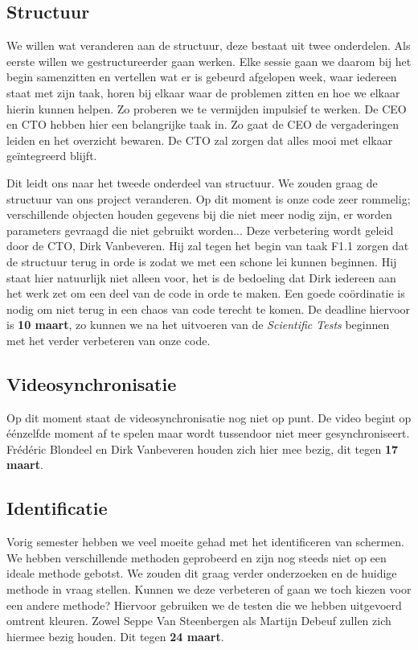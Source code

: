 \documentclass[a4paper,11pt]{article}
\begin{document}
\subsection{Structuur}
We willen wat veranderen aan de structuur, deze bestaat uit twee onderdelen. Als eerste willen we gestructureerder gaan werken. Elke sessie gaan we daarom bij het begin samenzitten en vertellen wat er is gebeurd afgelopen week, waar iedereen staat met zijn taak, horen bij elkaar waar de problemen zitten en hoe we elkaar hierin kunnen helpen. Zo proberen we te vermijden impulsief te werken. De CEO en CTO hebben hier een belangrijke taak in. Zo gaat de CEO de vergaderingen leiden en het overzicht bewaren. De CTO zal zorgen dat alles mooi met elkaar geïntegreerd blijft.

Dit leidt ons naar het tweede onderdeel van structuur. We zouden graag de structuur van ons project veranderen. Op dit moment is onze code zeer rommelig; verschillende objecten houden gegevens bij die niet meer nodig zijn, er worden parameters gevraagd die niet gebruikt worden... Deze verbetering wordt geleid door de CTO, Dirk Vanbeveren. Hij zal tegen het begin van taak F1.1 zorgen dat de structuur terug in orde is zodat we met een schone lei kunnen beginnen. Hij staat hier natuurlijk niet alleen voor, het is de bedoeling dat Dirk iedereen aan het werk zet om een deel van de code in orde te maken. Een goede coördinatie is nodig om niet terug in een chaos van code terecht te komen. De deadline hiervoor is {\bf 10 maart}, zo kunnen we na het uitvoeren van de {\it Scientific Tests} beginnen met het verder verbeteren van onze code.

\subsection{Videosynchronisatie}
Op dit moment staat de videosynchronisatie nog niet op punt. De video begint op éénzelfde moment af te spelen maar wordt tussendoor niet meer gesynchroniseert.  Frédéric Blondeel en Dirk Vanbeveren houden zich hier mee bezig, dit tegen {\bf 17 maart}.

\subsection{Identificatie}
Vorig semester hebben we veel moeite gehad met het identificeren van schermen. We hebben verschillende methoden geprobeerd en zijn nog steeds niet op een ideale methode gebotst. We zouden dit graag verder onderzoeken en de huidige methode in vraag stellen. Kunnen we deze verbeteren of gaan we toch kiezen voor een andere methode? Hiervoor gebruiken we de testen die we hebben uitgevoerd omtrent kleuren. Zowel Seppe Van Steenbergen als Martijn Debeuf zullen zich hiermee bezig houden. Dit tegen {\bf 24 maart}.
\end{document}
